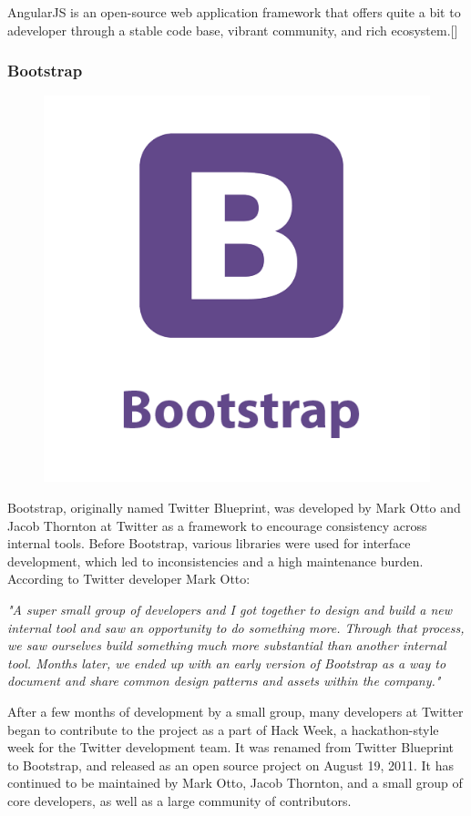 AngularJS is an open-source web application framework that offers quite a bit to adeveloper  through  a  stable  code  base,  vibrant  community,  and  rich  ecosystem.[\cite{1}]  


\subsubsection*{Bootstrap}
\begin{figure}[h]
	\centering
	\includegraphics[width=.5\linewidth]{images/bootstrap}
	\label{fig:bootstrap-logo}
\end{figure}
Bootstrap, originally named Twitter Blueprint, was developed by Mark Otto and Jacob Thornton at Twitter as a framework to encourage consistency across internal tools. Before Bootstrap, various libraries were used for interface development, which led to inconsistencies and a high maintenance burden. According to Twitter developer Mark Otto:
\newline

\textit{"A super small group of developers and I got together to design and build a new internal tool and saw an opportunity to do something more. Through that process, we saw ourselves build something much more substantial than another internal tool. Months later, we ended up with an early version of Bootstrap as a way to document and share common design patterns and assets within the company."}
\newline

After a few months of development by a small group, many developers at Twitter began to contribute to the project as a part of Hack Week, a hackathon-style week for the Twitter development team. It was renamed from Twitter Blueprint to Bootstrap, and released as an open source project on August 19, 2011. It has continued to be maintained by Mark Otto, Jacob Thornton, and a small group of core developers, as well as a large community of contributors.
\newline

